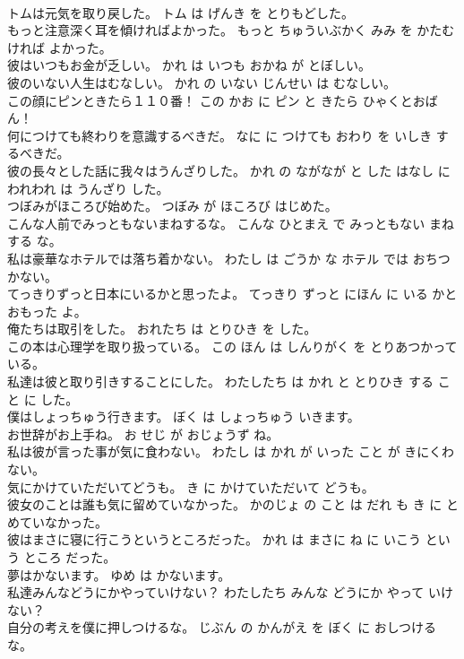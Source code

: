 \documentclass[8pt]{extreport}
\begin{document}
\begin{CJK}{UTF8}{min}
\\	トムは元気を取り戻した。	トム は げんき を とりもどした。	
\\	もっと注意深く耳を傾ければよかった。	もっと ちゅういぶかく みみ を かたむければ よかった。	
\\	彼はいつもお金が乏しい。	かれ は いつも おかね が とぼしい。	
\\	彼のいない人生はむなしい。	かれ の いない じんせい は むなしい。	
\\	この顔にピンときたら１１０番！	この かお に ピン と きたら ひゃくとおばん！	
\\	何につけても終わりを意識するべきだ。	なに に つけても おわり を いしき するべきだ。	
\\	彼の長々とした話に我々はうんざりした。	かれ の ながなが と した はなし に われわれ は うんざり した。	
\\	つぼみがほころび始めた。	つぼみ が ほころび はじめた。	
\\	こんな人前でみっともないまねするな。	こんな ひとまえ で みっともない まね する な。	
\\	私は豪華なホテルでは落ち着かない。	わたし は ごうか な ホテル では おちつかない。	
\\	てっきりずっと日本にいるかと思ったよ。	てっきり ずっと にほん に いる かと おもった よ。	
\\	俺たちは取引をした。	おれたち は とりひき を した。	
\\	この本は心理学を取り扱っている。	この ほん は しんりがく を とりあつかっている。	
\\	私達は彼と取り引きすることにした。	わたしたち は かれ と とりひき する こと に した。	
\\	僕はしょっちゅう行きます。	ぼく は しょっちゅう いきます。	
\\	お世辞がお上手ね。	お せじ が おじょうず ね。	
\\	私は彼が言った事が気に食わない。	わたし は かれ が いった こと が きにくわない。	
\\	気にかけていただいてどうも。	き に かけていただいて どうも。	
\\	彼女のことは誰も気に留めていなかった。	かのじょ の こと は だれ も き に とめていなかった。	
\\	彼はまさに寝に行こうというところだった。	かれ は まさに ね に いこう という ところ だった。	
\\	夢はかないます。	ゆめ は かないます。	
\\	私達みんなどうにかやっていけない？	わたしたち みんな どうにか やって いけない？	
\\	自分の考えを僕に押しつけるな。	じぶん の かんがえ を ぼく に おしつける な。	

\end{CJK}
\end{document}
